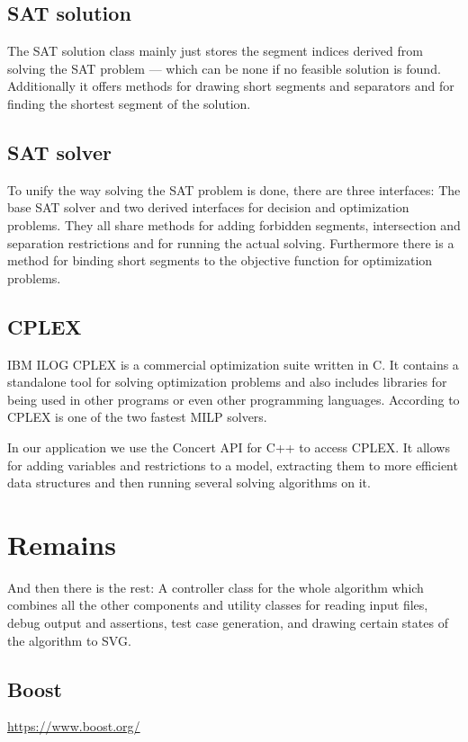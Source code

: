 \subsection{SAT solution}
The SAT solution class mainly just stores the segment indices derived
from solving the SAT problem --- which can be none if no feasible
solution is found. Additionally it offers methods for drawing short
segments and separators and for finding the shortest segment of the
solution.

\subsection{SAT solver}
To unify the way solving the SAT problem is done, there are three
interfaces: The base SAT solver and two derived interfaces for
decision and optimization problems. They all share methods for adding
forbidden segments, intersection and separation restrictions and for
running the actual solving. Furthermore there is a method for binding
short segments to the objective function for optimization problems.

\subsection{CPLEX}
IBM ILOG CPLEX \cite{cplex}
is a commercial optimization suite written in C. It contains a
standalone tool for solving optimization problems and also includes
libraries for being used in other programs or even other programming
languages. According to \cite{cplex_benchmark}
CPLEX is one of the two fastest MILP solvers.

In our application we use the Concert API for C++ \cite{cplex_concert}
to access CPLEX. It allows for adding variables and restrictions to
a model, extracting them to more efficient data structures and then
running several solving algorithms on it.

\section{Remains}
And then there is the rest: A controller
class for the whole algorithm which combines all the other components
and utility classes for reading input files, debug
output and assertions, test case generation, and drawing certain 
states of the algorithm to SVG.

\subsection{Boost}
\url{https://www.boost.org/}

